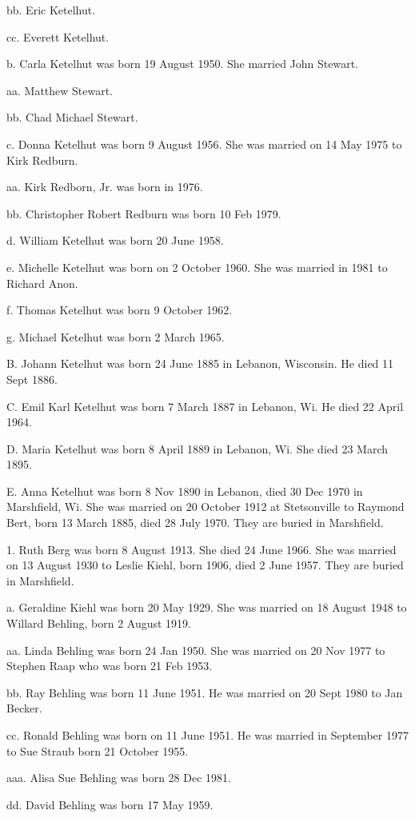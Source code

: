 \documentclass[a4paper]{article}
\begin{document}
bb. Eric Ketelhut.

cc. Everett Ketelhut.

b.  Carla Ketelhut was born 19 August 1950.  She married John Stewart.

aa.  Matthew Stewart.

bb. Chad Michael Stewart.

c. Donna Ketelhut was born 9 August 1956.  She was married on 14 May 1975 to Kirk Redburn.

aa. Kirk Redborn, Jr.  was born in 1976.

bb. Christopher Robert Redburn was born 10 Feb 1979.

d. William Ketelhut was born 20 June 1958.

e. Michelle Ketelhut was born on 2 October 1960.  She was married in 1981 to Richard Anon.

f. Thomas Ketelhut was born 9 October 1962.

g. Michael Ketelhut was born 2 March 1965.

B. Johann Ketelhut was born 24 June 1885 in Lebanon, Wisconsin.  He died 11 Sept 1886.

C.  Emil Karl Ketelhut was born 7 March 1887 in Lebanon, Wi.  He died 22 April 1964.

D. Maria Ketelhut was born 8 April 1889 in Lebanon, Wi.  She died 23 March 1895.

E. Anna Ketelhut was born 8 Nov 1890 in Lebanon, died 30 Dec 1970 in Marshfield, Wi. She was married on 20 October 1912 at Stetsonville to Raymond Bert, born 13 March 1885, died 28 July 1970.  They are buried in Marshfield.

1. Ruth Berg was born 8 August 1913.  She died 24 June 1966.  She was married on 13 August 1930 to Leslie Kiehl, born 1906, died 2 June 1957.  They are buried in Marshfield.

a. Geraldine Kiehl was born 20 May 1929.  She was married on 18 August 1948 to Willard Behling, born 2 August 1919.  

aa. Linda Behling was born 24 Jan 1950.  She was married on 20 Nov 1977 to Stephen Raap who was born 21 Feb 1953.

bb. Ray Behling was born 11 June 1951.  He was married on 20 Sept 1980 to Jan Becker.

cc. Ronald Behling was born on 11 June 1951.  He was married in September 1977 to Sue Straub born 21 October 1955.

aaa. Alisa Sue Behling was born 28 Dec 1981.

dd. David Behling was born 17 May 1959.
\end{document}

